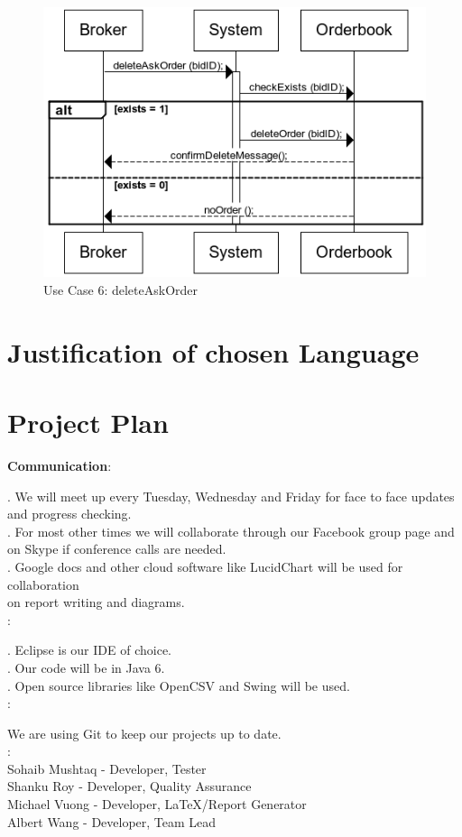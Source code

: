 \documentclass[a4paper]{article}
\begin{document}
\begin{figure}[H]
   \includegraphics[width=1\textwidth]{images/deleteAskOrder}
   \caption{Use Case 6: deleteAskOrder}
\end{figure}

\section {Justification of chosen Language}

\section {Project Plan}

{\bf Communication}: 

\indent{}.  We will meet up every Tuesday, Wednesday and Friday for face to face updates and progress checking. \\
\indent{}. For most other times we will collaborate through our Facebook group page and \\
on Skype if conference calls are needed. \\
\indent{}. Google docs and other cloud software like LucidChart will be used for collaboration \\
 on report writing and diagrams. \\

:

\indent{}. Eclipse is our IDE of choice. \\
\indent{}. Our code will be in Java 6. \\
\indent{}. Open source libraries like OpenCSV and Swing will be used. \\

:

We are using Git to keep our projects up to date. \\

: \\
\indent\indent Sohaib Mushtaq - Developer, Tester \\
\indent\indent Shanku Roy - Developer, Quality Assurance \\
\indent\indent Michael Vuong - Developer, LaTeX/Report Generator \\
\indent\indent Albert Wang -  Developer, Team Lead \\
\end{document}
